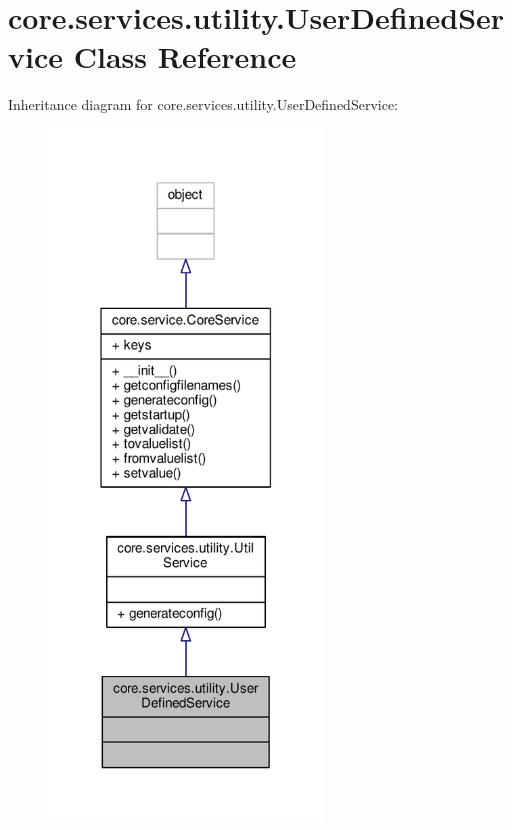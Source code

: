 \hypertarget{classcore_1_1services_1_1utility_1_1_user_defined_service}{\section{core.\+services.\+utility.\+User\+Defined\+Service Class Reference}
\label{classcore_1_1services_1_1utility_1_1_user_defined_service}
}


Inheritance diagram for core.\+services.\+utility.\+User\+Defined\+Service\+:
\nopagebreak
\begin{figure}[H]
\begin{center}
\leavevmode
\includegraphics[width=207pt]{classcore_1_1services_1_1utility_1_1_user_defined_service__inherit__graph}
\end{center}
\end{figure}


